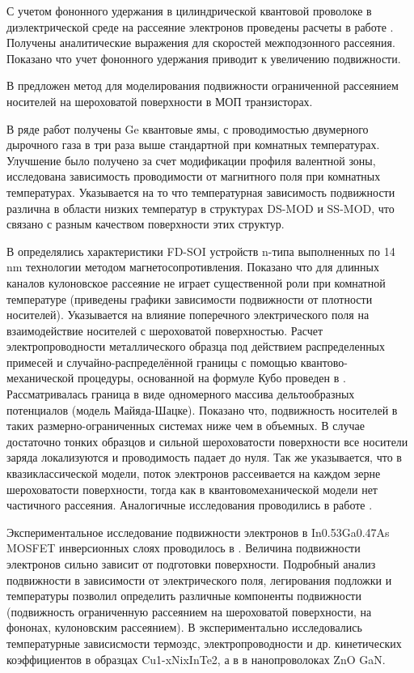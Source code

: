 С учетом фононного удержания в цилиндрической квантовой проволоке в диэлектрической среде на рассеяние электронов проведены расчеты в работе \cite{Vartanian2003}. Получены аналитические выражения для скоростей межподзонного рассеяния. Показано что учет фононного удержания приводит к увеличению подвижности.

В \cite{Lizzit2013} предложен метод для моделирования подвижности ограниченной рассеянием носителей на шероховатой поверхности в МОП транзисторах.

В ряде работ \cite{Myronov2008a,Myronov2008,Mironov2014,Myronov2015} получены Ge квантовые ямы, с проводимостью двумерного дырочного газа в три раза выше стандартной при комнатных температурах. Улучшение было получено за счет модификации профиля валентной зоны, исследована зависимость проводимости от магнитного поля при комнатных температурах. Указывается на то что температурная зависимость подвижности различна в области низких температур в структурах DS-MOD и SS-MOD, что связано с разным качеством поверхности этих структур.

В \cite{Shin2015} определялись характеристики FD-SOI устройств n-типа выполненных по 14 nm технологии методом магнетосопротивления. Показано что для длинных каналов кулоновское рассеяние не играет существенной роли при комнатной температуре (приведены графики зависимости подвижности от плотности носителей). Указывается на влияние поперечного электрического поля на взаимодействие носителей с шероховатой поверхностью. Расчет электропроводности металлического образца под действием распределенных примесей и случайно-распределённой границы с помощью квантово-механической процедуры, основанной на формуле Кубо проведен в \cite{Moraga2015}. Рассматривалась граница в виде одномерного массива дельтообразных потенциалов (модель Майяда-Шацке). Показано что, подвижность носителей в таких размерно-ограниченных системах ниже чем в объемных. В случае достаточно тонких образцов и сильной шероховатости поверхности все носители заряда локализуются и проводимость падает до нуля. Так же указывается, что в квазиклассической модели, поток электронов рассеивается на каждом зерне шероховатости поверхности, тогда как в квантовомеханической модели нет частичного рассеяния. Аналогичные исследования проводились в работе \cite{Arenas2015}.

Экспериментальное исследование подвижности электронов в In0.53Ga0.47As MOSFET инверсионных слоях проводилось в \cite{Sonnet2011}. Величина подвижности электронов сильно зависит от подготовки поверхности. Подробный анализ подвижности в зависимости от электрического поля, легирования подложки и температуры позволил определить различные компоненты подвижности (подвижность ограниченную рассеянием на шероховатой поверхности, на фононах, кулоновским рассеянием). В \cite{Kucek2015} экспериментально исследовались температурные зависисмости термоэдс, электропроводности и др. кинетических коэффициентов в образцах Cu1-xNixInTe2, а в \cite{Galagali2015} в нанопроволоках ZnO GaN.

